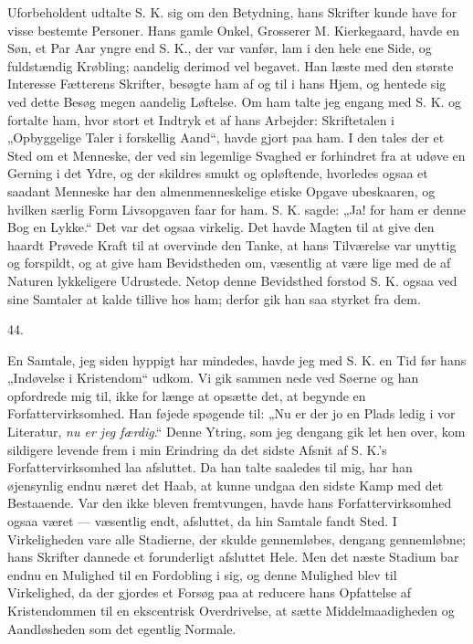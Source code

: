 \documentclass[12pt,a4paper,openany]{book}
\newcommand{\secnum}[1]{\par\begin{center}#1\end{center}\par\nobreak}
\newcommand{\opage}[1]{\marginnote{\footnotesize\textit{[#1]}}}
\begin{document}
Uforbeholdent udtalte S. K. sig om den Betydning, hans Skrifter kunde have
for visse bestemte Personer. Hans gamle Onkel, Grosserer M. Kierkegaard, havde
en Søn, et Par Aar yngre end S. K., der var vanfør, lam i den hele ene Side,
og fuldstændig Krøbling; aandelig derimod vel begavet. Han læste med den
største Interesse Fætterens Skrifter, besøgte ham af og til i hans Hjem, og
hentede sig ved dette Besøg megen aandelig Løftelse. Om ham talte jeg engang
med S. K. og fortalte ham, hvor stort et Indtryk et af hans Arbejder:
Skriftetalen i „Opbyggelige Taler i forskellig Aand“, havde gjort paa ham. I
den tales der et Sted om et Menneske, der ved sin legemlige Svaghed er
forhindret fra at udøve en Gerning i det Ydre, og der skildres smukt og
opløftende, hvorledes ogsaa et saadant Menneske har den
almenmenneskelige etiske Opgave ubeskaaren, og hvilken særlig Form
Livsopgaven faar for ham. S. K. sagde: „Ja! for ham er denne Bog en Lykke.“
Det var det ogsaa virkelig. Det havde Magten til at give den haardt Prøvede
Kraft til at overvinde den Tanke, at hans Tilværelse var unyttig og forspildt,
og at give ham Bevidstheden om, væsentlig at være lige med de af Naturen
lykkeligere Udrustede. Netop denne Bevidsthed forstod S. K. ogsaa ved sine
Samtaler at kalde tillive hos ham; derfor gik han saa styrket fra dem.

\secnum{\opage{369}44.}

En Samtale, jeg siden hyppigt har mindedes, havde jeg med S. K. en Tid før
hans „Indøvelse i Kristendom“ udkom. Vi gik sammen nede ved Søerne og han
opfordrede mig til, ikke for længe at opsætte det, at begynde en
Forfattervirksomhed. Han føjede spøgende til: „Nu er der jo en Plads ledig i
vor Literatur, \emph{nu er jeg færdig}.“ Denne Ytring, som jeg dengang gik let
hen over, kom sildigere levende frem i min Erindring da det sidste Afsnit af
S. K.’s Forfattervirksomhed laa afsluttet. Da han talte saaledes til mig, har
han øjensynlig endnu næret det Haab, at kunne undgaa den sidste Kamp med det
Bestaaende. Var den ikke bleven fremtvungen, havde hans Forfattervirksomhed
ogsaa været --- væsentlig endt, afsluttet, da hin Samtale fandt Sted. I
Virkeligheden vare alle Stadierne, der skulde gennemløbes, dengang
gennemløbne; hans Skrifter dannede et forunderligt afsluttet Hele. Men det
næste Stadium bar endnu en Mulighed til en Fordobling i sig, og denne
Mulighed blev til Virkelighed, da der gjordes et Forsøg paa at reducere hans
Opfattelse af Kristendommen til en ekscentrisk Overdrivelse, at sætte
Middelmaadigheden og Aandløsheden som det egentlig Normale.
\end{document}
